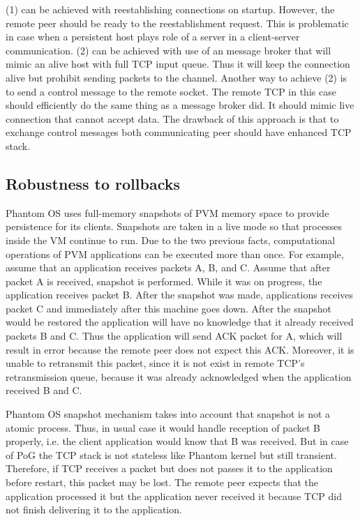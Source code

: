 (1) can be achieved with reestablishing connections on startup. However, the
remote peer should be ready to the reestablishment request. This is problematic
in case when a persistent host plays role of a server in a client-server
communication. (2) can be achieved with use of an message broker that will
mimic an alive host with full TCP input queue. Thus it will keep the connection
alive but prohibit sending packets to the channel. Another way to achieve (2)
is to send a control message to the remote socket. The remote TCP in this case
should efficiently do the same thing as a message broker did. It should mimic
live connection that cannot accept data. The drawback of this approach is that
to exchange control messages both communicating peer should have enhanced TCP
stack.

\subsection {Robustness to rollbacks}

Phantom OS uses full-memory snapshots of PVM memory space to provide
persistence for its clients. Snapshots are taken in a live mode so that
processes inside the VM continue to run. Due to the two previous facts,
computational operations of PVM applications can be executed more than once.
For example, assume that an application receives packets A, B, and C.  Assume
that after packet A is received, snapshot is performed. While it was on
progress, the application receives packet B. After the snapshot was made,
applications receives packet C and immediately after this machine goes down.
After the snapshot would be restored the application will have no knowledge
that it already received packets B and C. Thus the application will send ACK
packet for A, which will result in error because the remote peer does not
expect this ACK. Moreover, it is unable to retransmit this packet, since it is
not exist in remote TCP's retransmission queue, because it was already
acknowledged when the application received B and C.

Phantom OS snapshot mechanism takes into account that snapshot is not a atomic
process. Thus, in usual case it would handle reception of packet B properly,
i.e. the client application would know that B was received. But in case of 
PoG the TCP stack is not stateless like Phantom kernel but still transient.
Therefore, if TCP receives a packet but does not passes it to the application
before restart, this packet may be lost. The remote peer expects that the
application processed it but the application never received it because TCP did
not finish delivering it to the application.

